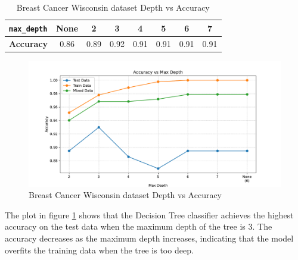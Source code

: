 \begin{table}[H]
    \centering
    \begin{tabular}{|l|c|c|c|c|c|c|c|}
        \hline
        \textbf{\texttt{max\_depth}} & None & 2 & 3 & 4 & 5 & 6 & 7 \\ \hline
        \textbf{Accuracy} & 0.86 & 0.89 & 0.92 & 0.91 & 0.91 & 0.91 & 0.91 \\ \hline
    \end{tabular}
    \caption{Breast Cancer Wisconsin dataset Depth vs Accuracy}
    \label{tab:breast_cancer_wisconsin_depth_vs_accuracy}
\end{table}

\begin{figure}[H]
    \centering
    \includegraphics[width=\textwidth]{figures/breast_cancer_wisconsin_accuracy_vs_max_depth.pdf}
    \caption{Breast Cancer Wisconsin dataset Depth vs Accuracy}
    \label{fig:breast_cancer_wisconsin_depth_vs_accuracy}
\end{figure}

The plot in figure \ref{fig:breast_cancer_wisconsin_depth_vs_accuracy} shows that the Decision Tree classifier achieves the highest accuracy on the test data
when the maximum depth of the tree is 3. The accuracy decreases as the maximum depth increases, indicating that the model overfits the training data when the tree is too deep.

